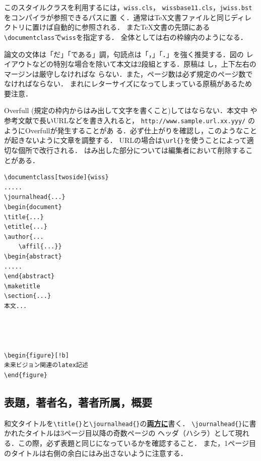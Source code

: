 \documentclass[twoside]{wiss}
\begin{document}
このスタイルクラスを利用するには，\verb|wiss.cls|，
\verb|wissbase11.cls|，\verb|jwiss.bst|をコンパイラが参照できるパスに置
く．通常は\TeX 文書ファイルと同じディレクトリに置けば自動的に参照される．
また\TeX 文書の先頭にある\verb|\documentclass|で\verb|wiss|を指定する．
全体としては右の枠線内のようになる．

論文の文体は「だ」「である」調，句読点は「，」「．」を強く推奨する．図の
レイアウトなどの特別な場合を除いて本文は2段組とする．原稿は
し，上下左右のマージンは厳守しなければな
らない．また，ページ数は必ず規定のページ数でなければならない．
まれにレターサイズになってしまっている原稿があるため要注意．

Overfull (規定の枠内からはみ出して文字を書くこと)してはならない．本文中
や参考文献で長いURLなどを書き入れると，
\verb|http://www.sample.url.xx.yyy/| のようにOverfullが発生することがあ
る．必ず仕上がりを確認し，このようなことが起きないように文章を調整する．
URLの場合は\verb|\url{}|を使うことによって適切な個所で改行される．
はみ出した部分については編集者において削除することがある．

\begin{screen}
\begin{verbatim}
\documentclass[twoside]{wiss}
.....
\journalhead{...}
\begin{document}
\title{...}
\etitle{...}
\author{...
    \affil{...}}
\begin{abstract}
.....
\end{abstract}
\maketitle
\section{...}
本文...




\begin{figure}[!b]
未来ビジョン関連のlatex記述
\end{figure}
\end{verbatim}
\end{screen}



\subsection{表題，著者名，著者所属，概要}

和文タイトルを\verb|\title{}|と\verb|\journalhead{}|の\underline{\textbf{両方に}}書く．
\verb|\journalhead{}|に書かれたタイトルは3ページ目以降の奇数ページの
ヘッダ（ハシラ）として現れる．この際，必ず表題と同じになっているかを確認すること．
また，1ページ目のタイトルは右側の余白にはみ出さないように注意する．
\end{document}
